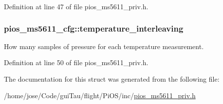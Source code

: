 Definition at line 47 of file pios\-\_\-ms5611\-\_\-priv.\-h.

\hypertarget{structpios__ms5611__cfg_a9e5737bd6a7bb20da4ac013fb0726845}{
\subsubsection[{temperature\-\_\-interleaving}]{ pios\-\_\-ms5611\-\_\-cfg\-::temperature\-\_\-interleaving}}\label{structpios__ms5611__cfg_a9e5737bd6a7bb20da4ac013fb0726845}


How many samples of pressure for each temperature measurement. 



Definition at line 50 of file pios\-\_\-ms5611\-\_\-priv.\-h.



The documentation for this struct was generated from the following file\-:\begin{DoxyCompactItemize}
\item 
/home/jose/\-Code/gui\-Tau/flight/\-Pi\-O\-S/inc/\hyperlink{pios__ms5611__priv_8h}{pios\-\_\-ms5611\-\_\-priv.\-h}\end{DoxyCompactItemize}

